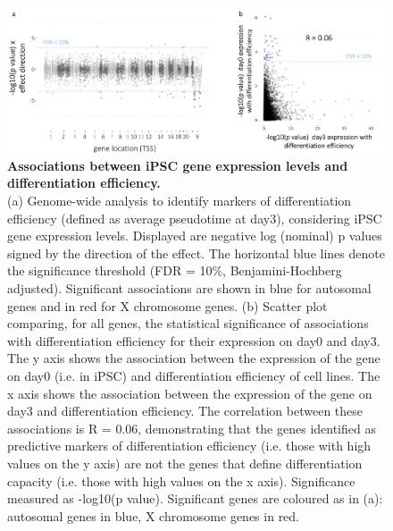 \begin{figure}[h]
\centering
\includegraphics[width=15.5cm]{Chapter4/Fig/endodiff_diff_eff_manhattan.png}
\caption[Associations between iPSC gene expression levels and differentiation efficiency]{\textbf{Associations between iPSC gene expression levels and differentiation efficiency.}\\
(a) Genome-wide analysis to identify markers of differentiation efficiency (defined as average pseudotime at day3), considering iPSC gene expression levels. 
Displayed are negative log (nominal) p values signed by the direction of the effect. 
The horizontal blue lines denote the significance threshold (FDR = 10\%, Benjamini-Hochberg adjusted). 
Significant associations are shown in blue for autosomal genes and in red for X chromosome genes. 
(b) Scatter plot comparing, for all genes, the statistical significance of associations with differentiation efficiency for their expression on day0 and day3. 
The y axis shows the association between the expression of the gene on day0 (i.e. in iPSC) and differentiation efficiency of cell lines. 
The x axis shows the association between the expression of the gene on day3 and differentiation efficiency. 
The correlation between these associations is R = 0.06, demonstrating that the genes identified as predictive markers of differentiation efficiency (i.e. those with high values on the y axis) are not the genes that define differentiation capacity (i.e. those with high values on the x axis). 
Significance measured as -log10(p value). 
Significant genes are coloured as in (a): autosomal genes in blue, X chromosome genes in red.}
\label{fig:endodiff_manhattan_differentiation}
\end{figure}


